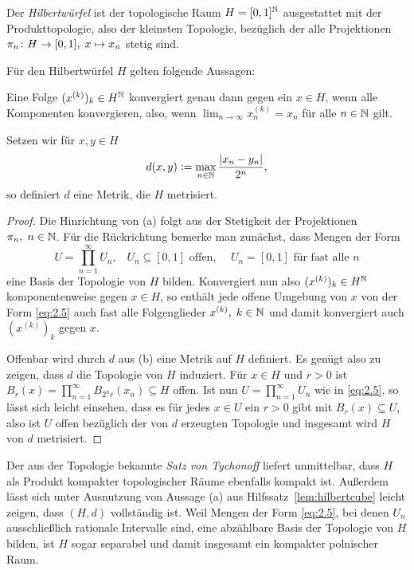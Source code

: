 \documentclass[../main/main.tex]{subfiles}
\begin{document}
	\begin{Definition}[Hilbertwürfel]
		Der \emph{Hilbertwürfel} ist der topologische Raum $H = [0, 1]^{\mathbb{N}}$ ausgestattet mit der Produkttopologie, also der kleinsten Topologie, bezüglich der alle Projektionen $\pi_n \colon H \to [0, 1], \; x \mapsto x_n $ stetig sind.
	\end{Definition}

	\begin{Hilfssatz}
		\label{lem:hilbertcube}
		Für den Hilbertwürfel $H$ gelten folgende Aussagen:
		\begin{enumeratethm}
			\item Eine Folge $(x^{(k)})_k \in H^{\mathbb{N}}$ konvergiert genau dann gegen ein $x \in H$, wenn alle Komponenten konvergieren, also, wenn
			$\lim_{n \to \infty} x_n^{(k)} = x_n$ für alle $n \in \mathbb{N}$ gilt.
			\item Setzen wir für $x, y \in H$
			$$d(x, y) \vcentcolon = \max_{n \in \mathbb{N}} \frac{|x_n - y_n|}{2^n} \text{,}$$
			so definiert $d$ eine Metrik, die $H$ metrisiert.
		\end{enumeratethm}
	\end{Hilfssatz}

	\begin{proof}
		Die Hinrichtung von (a) folgt aus der Stetigkeit der Projektionen $\pi_n, \; n \in \mathbb{N}$. Für die Rückrichtung bemerke man zunächst, dass Mengen der Form 
		\[U = \prod_{n=1}^{\infty} U_n\text{,} \quad U_n \subseteq [0, 1] \text{ offen, } \quad U_n = [0, 1] \text{ für fast alle } n \label{eq:2.5} \tag{2.5}\]
		eine Basis der Topologie von $H$ bilden. 
		Konvergiert nun also $(x^{(k)})_k \in H^{\mathbb{N}}$ komponentenweise gegen $x \in H$, so enthält jede offene Umgebung von $x$ von der Form \eqref{eq:2.5} auch fast alle Folgenglieder $x^{(k)}, \; k \in \mathbb{N}$ und damit konvergiert auch $(x^{(k)})_k$ gegen $x$.
		
		Offenbar wird durch $d$ aus (b) eine Metrik auf $H$ definiert. Es genügt also zu zeigen, dass $d$ die Topologie von $H$ induziert. 
		Für $x \in H$ und $r > 0$ ist $B_r(x) = \prod_{n=1}^{\infty} B_{2^n r}(x_n) \subseteq H$ offen. Ist nun $U = \prod_{n=1}^{\infty} U_n$ wie in \eqref{eq:2.5}, so lässt sich leicht einsehen, dass es für jedes $x \in U$ ein $r > 0$ gibt mit $B_r(x) \subseteq U$, also ist $U$ offen bezüglich der von $d$ erzeugten Topologie und insgesamt wird $H$ von $d$ metrisiert.
	\end{proof}

	\begin{Bemerkung}
		Der aus der Topologie bekannte \emph{Satz von Tychonoff} liefert unmittelbar, dass $H$ als Produkt kompakter topologischer Räume ebenfalls kompakt ist.
		Außerdem lässt sich unter Ausnutzung von Aussage (a) aus Hilfssatz~\ref{lem:hilbertcube} leicht zeigen, dass $(H, d)$ vollständig ist. Weil Mengen der Form \eqref{eq:2.5}, bei denen $U_n$ ausschließlich rationale Intervalle sind, eine abzählbare Basis der Topologie von $H$ bilden, ist $H$ sogar separabel und damit insgesamt ein kompakter polnischer Raum.
	\end{Bemerkung}
\end{document}
